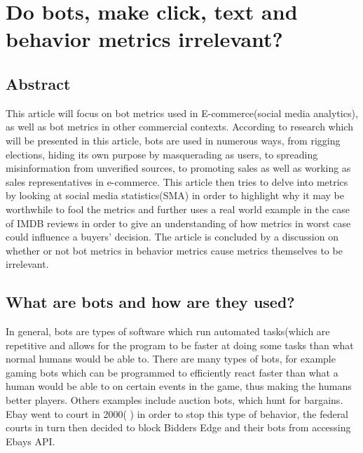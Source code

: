 \chapter[Bot Metrics]{Do bots,  make click, text and behavior metrics irrelevant?}
\section{Abstract}
This article will focus on bot metrics used in E-commerce(social media analytics), as well as bot metrics in other commercial contexts. According to research which will be presented in this article, bots are used in numerous ways, from rigging elections, hiding its own purpose by masquerading as users, to spreading misinformation from unverified sources, to promoting sales as well as working as sales representatives in e-commerce. This article then tries to delve into metrics by looking at social media statistics(SMA) in order to highlight why it may be worthwhile to fool the metrics and further uses a real world example in the case of IMDB reviews in order to give an understanding of how metrics in worst case could influence a buyers' decision. The article is concluded by a discussion on whether or not bot metrics in behavior metrics cause metrics themselves to be irrelevant. 

\section{What are bots and how are they used?}\label{intro:howwhenwhy}
In general, bots are types of software which run automated tasks(which are repetitive and allows for the program to be faster at doing some tasks than what normal humans would be able to. There are many types of bots, for example gaming bots which can be programmed to efficiently react faster than what a human would be able to on certain events in the game, thus making the humans better players. Others examples include auction bots, which hunt for bargains. Ebay went to court in 2000( \cite{Computerworld:Ebay}) in order to stop this type of behavior, the federal courts in turn then decided to block Bidders Edge and their bots from accessing Ebays API.
\\

